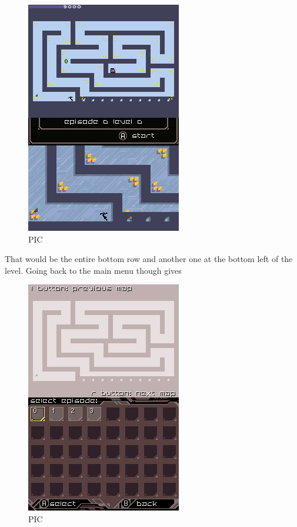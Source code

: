 \documentclass[
]{book}
\begin{document}
\begin{figure}
\centering
\includegraphics{images/171_home_fast6191_romhackingguide_unrenamed_fil___ers_romhackingguideleveleditingworkedNplus4.png}
\caption{PIC}
\end{figure}

That would be the entire bottom row and another one at the bottom left of the level. Going back to the main menu though gives

\begin{figure}
\centering
\includegraphics{images/172_home_fast6191_romhackingguide_unrenamed_fil___ers_romhackingguideleveleditingworkedNplus6.png}
\caption{PIC}
\end{figure}
\end{document}
